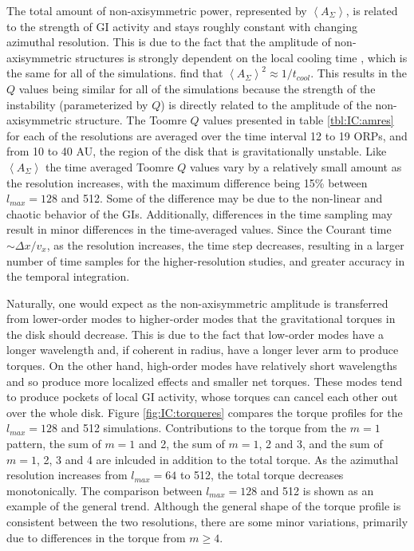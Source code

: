 The total amount of non-axisymmetric power, represented by $\left<A_\Sigma\right>$, is related to the strength of GI activity and stays roughly constant with changing azimuthal resolution. This is due to the fact that the amplitude of non-axisymmetric structures is strongly dependent on the local cooling time \citep{cossins2009}, which is the same for all of the simulations. \citet{cossins2009} find that $\left<A_\Sigma\right>^2 \approx 1/t_{cool}$. This results in the $Q$ values being similar for all of the simulations because the strength of the instability (parameterized by $Q$) is directly related to the amplitude of the non-axisymmetric structure. The Toomre $Q$ values presented in table \ref{tbl:IC:amres} for each of the resolutions are averaged over the time interval 12 to 19 ORPs, and from 10 to 40 AU, the region of the disk that is gravitationally unstable. Like $\left<A_\Sigma\right>$ the time averaged Toomre $Q$ values vary by a relatively small amount as the resolution increases, with the maximum difference being 15\% between $l_{max} = 128$ and 512. Some of the difference may be due to the non-linear and chaotic behavior of the GIs. Additionally, differences in the time sampling may result in minor differences in the time-averaged values. Since the Courant time $\sim \Delta x/v_x$, as the resolution increases, the time step decreases, resulting in a larger number of time samples for the higher-resolution studies, and greater accuracy in the temporal integration. 

Naturally, one would expect as the non-axisymmetric amplitude is transferred from lower-order modes to higher-order modes that the gravitational torques in the disk should decrease. This is due to the fact that low-order modes have a longer wavelength and, if coherent in radius, have a longer lever arm to produce torques. On the other hand, high-order modes have relatively short wavelengths and so produce more localized effects and smaller net torques. These modes tend to produce pockets of local GI activity, whose torques can cancel each other out over the whole disk. Figure \ref{fig:IC:torqueres} compares the torque profiles for the $l_{max} = 128$ and 512 simulations. Contributions to the torque from the $m =1$ pattern, the sum of $m = 1$ and 2, the sum of $m =1$, 2 and 3, and the sum of $m=1$, 2, 3 and 4 are inlcuded in addition to the total torque. As the azimuthal resolution increases from $l_{max} = 64$ to 512, the total torque decreases monotonically. The comparison between $l_{max} = 128 $ and 512 is shown as an example of the general trend. Although the general shape of the torque profile is consistent between the two resolutions, there are some minor variations, primarily due to differences in the torque from $m \geq 4$. 

